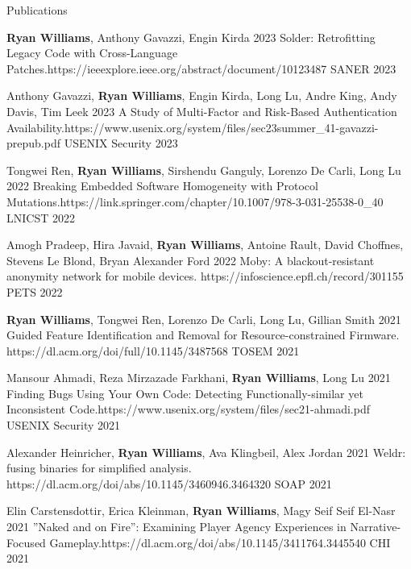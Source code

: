 \documentclass[]{cv}
\begin{document}
\begin{section}{Publications}

\begin{pub}
    {\textbf{Ryan Williams}, Anthony Gavazzi, Engin Kirda}
    {2023}
    {Solder: Retrofitting Legacy Code with Cross-Language Patches.}{https://ieeexplore.ieee.org/abstract/document/10123487}
    {SANER 2023}
\end{pub}

\begin{pub}
    {Anthony Gavazzi, \textbf{Ryan Williams}, Engin Kirda, Long Lu, Andre King, Andy Davis, Tim Leek}
    {2023}
    {A Study of Multi-Factor and Risk-Based Authentication Availability.}{https://www.usenix.org/system/files/sec23summer_41-gavazzi-prepub.pdf}
    {USENIX Security 2023}
\end{pub}

\begin{pub}
    {Tongwei Ren, \textbf{Ryan Williams}, Sirshendu Ganguly, Lorenzo De Carli, Long Lu}
    {2022}
    {Breaking Embedded Software Homogeneity with Protocol Mutations.}{https://link.springer.com/chapter/10.1007/978-3-031-25538-0_40}
    {LNICST 2022}
\end{pub}

\begin{pub}
    {Amogh Pradeep, Hira Javaid, \textbf{Ryan Williams}, Antoine Rault, David Choffnes, Stevens Le Blond, Bryan Alexander Ford}
    {2022}
    {Moby: A blackout-resistant anonymity network for mobile devices.}
    {https://infoscience.epfl.ch/record/301155}
    {PETS 2022}
\end{pub}

\begin{pub}
    {\textbf{Ryan Williams}, Tongwei Ren, Lorenzo De Carli, Long Lu, Gillian Smith}
    {2021}
    {Guided Feature Identification and Removal for Resource-constrained Firmware.}
    {https://dl.acm.org/doi/full/10.1145/3487568}
    {TOSEM 2021}
\end{pub}

\begin{pub}
    {Mansour Ahmadi, Reza Mirzazade Farkhani, \textbf{Ryan Williams}, Long Lu}
    {2021}
    {Finding Bugs Using Your Own Code: Detecting Functionally-similar yet Inconsistent Code.}{https://www.usenix.org/system/files/sec21-ahmadi.pdf}
    {USENIX Security 2021}
\end{pub}

\begin{pub}
    {Alexander Heinricher, \textbf{Ryan Williams}, Ava Klingbeil, Alex Jordan}
    {2021}
    {Weldr: fusing binaries for simplified analysis.}
    {https://dl.acm.org/doi/abs/10.1145/3460946.3464320}
    {SOAP 2021}
\end{pub}

\begin{pub}
    {Elin Carstensdottir, Erica Kleinman, \textbf{Ryan Williams}, Magy Seif Seif El-Nasr}
    {2021}
    {”Naked and on Fire”: Examining Player Agency Experiences in Narrative-Focused Gameplay.}{https://dl.acm.org/doi/abs/10.1145/3411764.3445540}
    {CHI 2021}
\end{pub}
    
\end{section}
\end{document}
